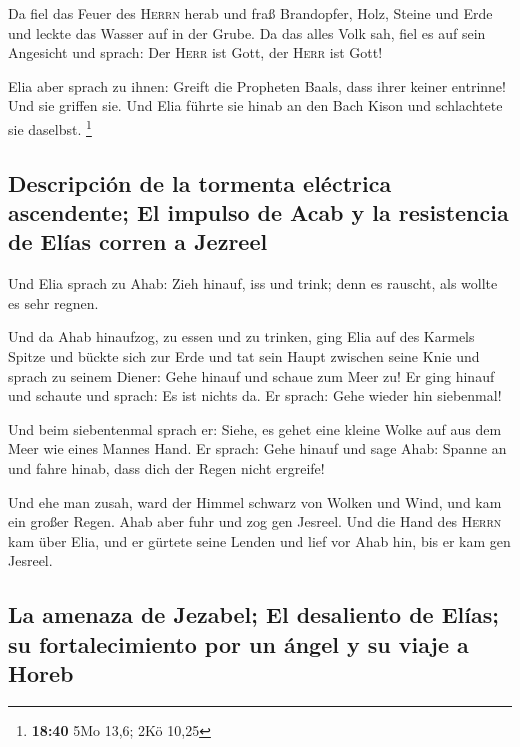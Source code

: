  Da fiel das Feuer des \textsc{Herrn} herab und fraß
Brandopfer, Holz, Steine und Erde und leckte das Wasser auf in der
Grube.  Da das alles Volk sah, fiel es auf sein Angesicht
und sprach: Der \textsc{Herr} ist Gott, der \textsc{Herr} ist Gott!

 Elia aber sprach zu ihnen: Greift die Propheten Baals,
dass ihrer keiner entrinne! Und sie griffen sie. Und Elia führte sie
hinab an den Bach Kison und schlachtete sie daselbst. \footnote{\textbf{18:40}
  5Mo 13,6; 2Kö 10,25}

\hypertarget{descripciuxf3n-de-la-tormenta-eluxe9ctrica-ascendente-el-impulso-de-acab-y-la-resistencia-de-eluxedas-corren-a-jezreel}{%
\subsection{Descripción de la tormenta eléctrica ascendente; El impulso
de Acab y la resistencia de Elías corren a
Jezreel}\label{descripciuxf3n-de-la-tormenta-eluxe9ctrica-ascendente-el-impulso-de-acab-y-la-resistencia-de-eluxedas-corren-a-jezreel}}

 Und Elia sprach zu Ahab: Zieh hinauf, iss und trink;
denn es rauscht, als wollte es sehr regnen.

 Und da Ahab hinaufzog, zu essen und zu trinken, ging
Elia auf des Karmels Spitze und bückte sich zur Erde und tat sein Haupt
zwischen seine Knie  und sprach zu seinem Diener: Gehe
hinauf und schaue zum Meer zu! Er ging hinauf und schaute und sprach: Es
ist nichts da. Er sprach: Gehe wieder hin siebenmal!

 Und beim siebentenmal sprach er: Siehe, es gehet eine
kleine Wolke auf aus dem Meer wie eines Mannes Hand. Er sprach: Gehe
hinauf und sage Ahab: Spanne an und fahre hinab, dass dich der Regen
nicht ergreife!

 Und ehe man zusah, ward der Himmel schwarz von Wolken
und Wind, und kam ein großer Regen. Ahab aber fuhr und zog gen Jesreel.
 Und die Hand des \textsc{Herrn} kam über Elia, und er
gürtete seine Lenden und lief vor Ahab hin, bis er kam gen Jesreel.

\hypertarget{la-amenaza-de-jezabel-el-desaliento-de-eluxedas-su-fortalecimiento-por-un-uxe1ngel-y-su-viaje-a-horeb}{%
\subsection{La amenaza de Jezabel; El desaliento de Elías; su
fortalecimiento por un ángel y su viaje a
Horeb}\label{la-amenaza-de-jezabel-el-desaliento-de-eluxedas-su-fortalecimiento-por-un-uxe1ngel-y-su-viaje-a-horeb}}

